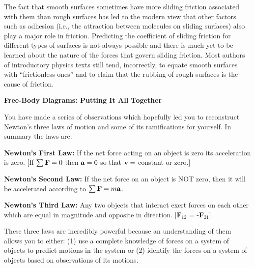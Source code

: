 The fact that smooth surfaces sometimes have more sliding friction associated
with them than rough surfaces has led to the modern view that other factors
such as adhesion (i.e., the attraction between molecules on sliding surfaces)
also play a major role in friction. Predicting the coefficient of sliding friction
for different types of surfaces is not always possible and there is much yet
to be learned about the nature of the forces that govern sliding friction. Most
authors of introductory physics texts still tend, incorrectly, to equate smooth
surfaces with ``frictionless ones'' and to claim that the rubbing
of rough surfaces is the cause of friction.

\textbf{Free-Body Diagrams: Putting It All Together} 

You have made a series of observations which hopefully led you to reconstruct
Newton's three laws of motion and some of its ramifications for yourself. In
summary the laws are:

\textbf{Newton's First Law:} If the net force acting on an object is zero its
acceleration is zero. {[}If \( \sum  {\bf F} = 0\) then ${\bf a} = 0$
so that ${\bf v} =$ constant or zero.{]}

\textbf{Newton's Second Law:} If the net force on an object is NOT zero, then it will be accelerated according to \( \sum {\bf F} = m{\bf a}\).

\textbf{Newton's Third Law:} Any two objects that interact exert forces on each
other which are equal in magnitude and opposite in direction. {[}\textbf{F}\( _{12} \)
= -\textbf{F}\( _{21} \){]}

These three laws are incredibly powerful because an understanding of them allows
you to either: (1) use a complete knowledge of forces on a system of objects
to predict motions in the system or (2) identify the forces on a system of objects
based on observations of its motions. 



%
%


